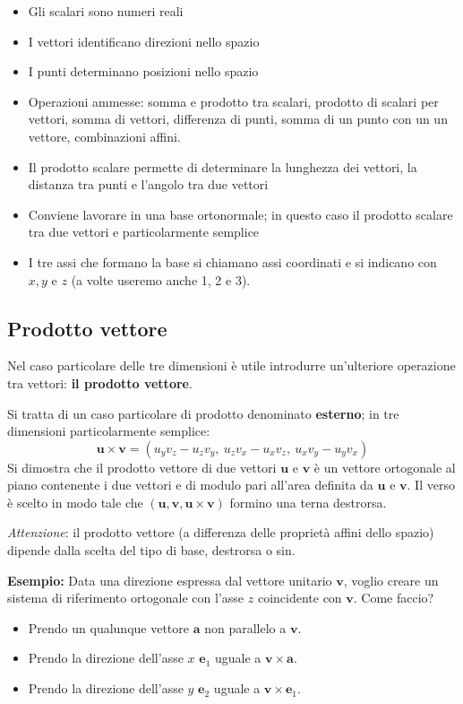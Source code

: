\documentclass[a4paper, 10pt]{article}
\renewcommand{\vec}{\bm}
\begin{document}
		\begin{itemize}
			\item Gli scalari sono numeri reali
			\item I vettori identificano direzioni nello spazio
			\item I punti determinano posizioni nello spazio
			\item Operazioni ammesse:
			somma e prodotto tra scalari, prodotto di scalari per vettori, somma
			di vettori, differenza di punti, somma di un punto con un un vettore,
			combinazioni affini.
			\item Il prodotto scalare permette di determinare la lunghezza dei
			vettori, la distanza tra punti e l'angolo tra due vettori
			\item Conviene lavorare in una base ortonormale; in questo caso il
			prodotto scalare tra due vettori e particolarmente semplice
			\item I tre assi che formano la base si chiamano assi coordinati e si
			indicano con $ x, y $ e $ z $ (a volte useremo anche 1, 2 e 3).
		\end{itemize}
		
		\subsection{Prodotto vettore}
		Nel caso particolare delle tre dimensioni è utile introdurre
		un'ulteriore operazione tra vettori: \textbf{il prodotto vettore}.
		
		\noindent
		Si tratta di un caso particolare di prodotto denominato
		\textbf{esterno}; in tre dimensioni particolarmente semplice:
		\[
		\vec{u}\times\vec{v} = (u_y v_z - u_z v_y,\: u_z v_x - u_x v_z,\: u_x v_y - u_y v_x)
		\]
		Si dimostra che il prodotto vettore di due vettori $ \vec{u} $ e $ \vec{v} $ è un
		vettore ortogonale al piano contenente i due vettori e di
		modulo pari all'area definita da $ \vec{u} $ e $ \vec{v} $. Il verso è scelto in modo
		tale che $ (\vec{u}, \vec{v}, \vec{u} \times \vec{v}) $ formino una terna destrorsa.
				
		\noindent
		\textit{Attenzione}: il prodotto vettore (a differenza delle proprietà affini
		dello spazio) dipende dalla scelta del tipo di base, destrorsa o sin.
				
		\textbf{Esempio:} Data una direzione espressa dal vettore unitario $ \vec{v} $, voglio
		creare un sistema di riferimento ortogonale con l'asse $ z $
		coincidente con $ \vec{v} $. Come faccio?
		\begin{itemize}
			\item Prendo un qualunque vettore $ \vec{a} $ non parallelo a $ \vec{v} $.
			\item Prendo la direzione dell'asse $ x $ $ \vec{e}_1 $ uguale a $ \vec{v} \times \vec{a} $.
			\item Prendo la direzione dell'asse $ y $ $ \vec{e}_2 $ uguale a $ \vec{v} \times \vec{e}_1 $.
		\end{itemize}
				
\end{document}
